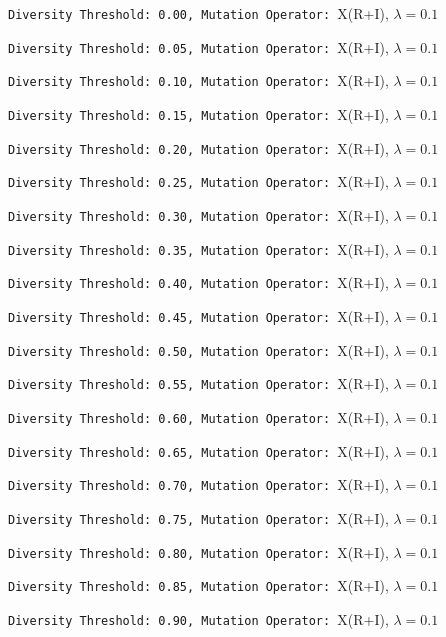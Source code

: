 \documentclass{article}
\begin{document}
\newpage
\verb|Diversity Threshold: 0.00, Mutation Operator: |X(R+I), $\lambda=0.1$

\newpage
\verb|Diversity Threshold: 0.05, Mutation Operator: |X(R+I), $\lambda=0.1$

\newpage
\verb|Diversity Threshold: 0.10, Mutation Operator: |X(R+I), $\lambda=0.1$

\newpage
\verb|Diversity Threshold: 0.15, Mutation Operator: |X(R+I), $\lambda=0.1$

\newpage
\verb|Diversity Threshold: 0.20, Mutation Operator: |X(R+I), $\lambda=0.1$

\newpage
\verb|Diversity Threshold: 0.25, Mutation Operator: |X(R+I), $\lambda=0.1$

\newpage
\verb|Diversity Threshold: 0.30, Mutation Operator: |X(R+I), $\lambda=0.1$

\newpage
\verb|Diversity Threshold: 0.35, Mutation Operator: |X(R+I), $\lambda=0.1$

\newpage
\verb|Diversity Threshold: 0.40, Mutation Operator: |X(R+I), $\lambda=0.1$

\newpage
\verb|Diversity Threshold: 0.45, Mutation Operator: |X(R+I), $\lambda=0.1$

\newpage
\verb|Diversity Threshold: 0.50, Mutation Operator: |X(R+I), $\lambda=0.1$

\newpage
\verb|Diversity Threshold: 0.55, Mutation Operator: |X(R+I), $\lambda=0.1$

\newpage
\verb|Diversity Threshold: 0.60, Mutation Operator: |X(R+I), $\lambda=0.1$

\newpage
\verb|Diversity Threshold: 0.65, Mutation Operator: |X(R+I), $\lambda=0.1$

\newpage
\verb|Diversity Threshold: 0.70, Mutation Operator: |X(R+I), $\lambda=0.1$

\newpage
\verb|Diversity Threshold: 0.75, Mutation Operator: |X(R+I), $\lambda=0.1$

\newpage
\verb|Diversity Threshold: 0.80, Mutation Operator: |X(R+I), $\lambda=0.1$

\newpage
\verb|Diversity Threshold: 0.85, Mutation Operator: |X(R+I), $\lambda=0.1$

\newpage
\verb|Diversity Threshold: 0.90, Mutation Operator: |X(R+I), $\lambda=0.1$

\end{document}
